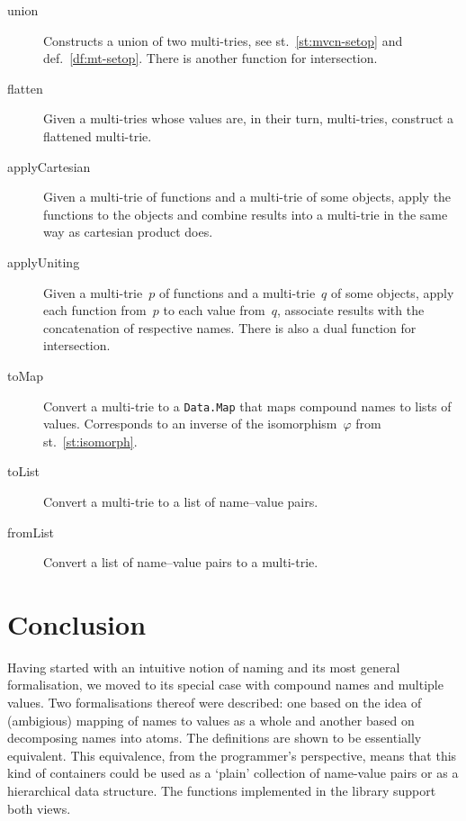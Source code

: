 \documentclass{article}
\theoremstyle{definition}
\begin{document}
\begin{description}
\item [union]
  Constructs a union of two multi-tries, see st.~\ref{st:mvcn-setop} and
  def.~\ref{df:mt-setop}. There is another function for intersection.
\item [flatten]
  Given a multi-tries whose values are, in their turn, multi-tries, construct
  a flattened multi-trie.
\item [applyCartesian]
  Given a multi-trie of functions and a multi-trie of some objects, apply the
  functions to the objects and combine results into a multi-trie in the same
  way as cartesian product does.
\item [applyUniting]
  Given a multi-trie~$p$ of functions and a multi-trie~$q$ of some objects,
  apply each function from~$p$ to each value from~$q$, associate results with
  the concatenation of respective names.
  There is also a dual function for intersection.
\item [toMap]
  Convert a multi-trie to a \lstinline{Data.Map} that maps compound names to
  lists of values. Corresponds to an inverse of the isomorphism~$\varphi$
  from st.~\ref{st:isomorph}.
\item [toList]
  Convert a multi-trie to a list of name--value pairs.
\item [fromList]
  Convert a list of name--value pairs to a multi-trie.
\end{description}



\section{Conclusion}

Having started with an intuitive notion of naming and its most general
formalisation, we moved to its special case with compound names and multiple
values. Two formalisations thereof were described: one based on the idea of
(ambigious) mapping of names to values as a whole and another based on
decomposing names into atoms. The definitions are shown to be essentially
equivalent. This equivalence, from the programmer's perspective, means that
this kind of containers could be used as a `plain' collection of name-value
pairs or as a hierarchical data structure. The functions implemented in the
library support both views.

\end{document}

